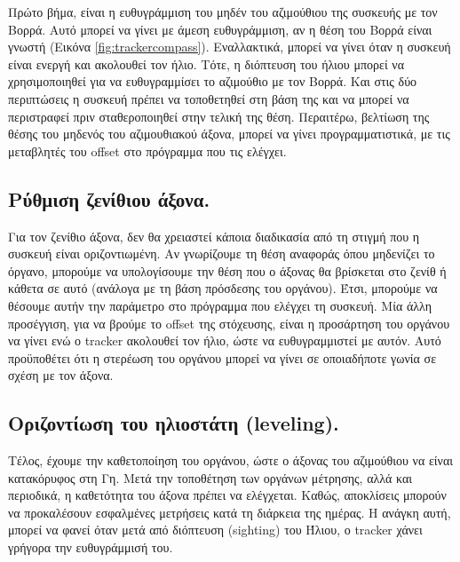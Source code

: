 \documentclass[
  a4paper,
  twoside,
  titlepage,
  11pt]{article}
\numberwithin{equation}{section}
\numberwithin{figure}{section}
\numberwithin{table}{section}
\begin{document}
Πρώτο βήμα, είναι η ευθυγράμμιση του μηδέν του αζιμούθιου της συσκευής με τον Βορρά. Αυτό μπορεί να γίνει με άμεση ευθυγράμμιση, αν η θέση του Βορρά είναι γνωστή (Εικόνα \ref{fig:trackercompass}). Εναλλακτικά, μπορεί να γίνει όταν η συσκευή είναι ενεργή και ακολουθεί τον ήλιο. Τότε, η διόπτευση του ήλιου μπορεί να χρησιμοποιηθεί για να ευθυγραμμίσει το αζιμούθιο με τον Βορρά. Και στις δύο περιπτώσεις η συσκευή πρέπει να τοποθετηθεί στη βάση της και να μπορεί να περιστραφεί πριν σταθεροποιηθεί στην τελική της θέση. Περαιτέρω, βελτίωση της θέσης του μηδενός του αζιμουθιακού άξονα, μπορεί να γίνει προγραμματιστικά, με τις μεταβλητές του offset στο πρόγραμμα που τις ελέγχει.

\hypertarget{ux3c1ux3cdux3b8ux3bcux3b9ux3c3ux3b7-ux3b6ux3b5ux3bdux3afux3b8ux3b9ux3bfux3c5-ux3acux3beux3bfux3bdux3b1.}{%
\subsection{Ρύθμιση ζενίθιου άξονα.}\label{ux3c1ux3cdux3b8ux3bcux3b9ux3c3ux3b7-ux3b6ux3b5ux3bdux3afux3b8ux3b9ux3bfux3c5-ux3acux3beux3bfux3bdux3b1.}}

Για τον ζενίθιο άξονα, δεν θα χρειαστεί κάποια διαδικασία από τη στιγμή που η συσκευή είναι οριζοντιωμένη. Αν γνωρίζουμε τη θέση αναφοράς όπου μηδενίζει το όργανο, μπορούμε να υπολογίσουμε την θέση που ο άξονας θα βρίσκεται στο ζενίθ ή κάθετα σε αυτό (ανάλογα με τη βάση πρόσδεσης του οργάνου). Έτσι, μπορούμε να θέσουμε αυτήν την παράμετρο στο πρόγραμμα που ελέγχει τη συσκευή. Μία άλλη προσέγγιση, για να βρούμε το offset της στόχευσης, είναι η προσάρτηση του οργάνου να γίνει ενώ ο tracker ακολουθεί τον ήλιο, ώστε να ευθυγραμμιστεί με αυτόν. Αυτό προϋποθέτει ότι η στερέωση του οργάνου μπορεί να γίνει σε οποιαδήποτε γωνία σε σχέση με τον άξονα.

\hypertarget{ux3bfux3c1ux3b9ux3b6ux3bfux3bdux3c4ux3afux3c9ux3c3ux3b7-ux3c4ux3bfux3c5-ux3b7ux3bbux3b9ux3bfux3c3ux3c4ux3acux3c4ux3b7-leveling.}{%
\subsection{Οριζοντίωση του ηλιοστάτη (leveling).}\label{ux3bfux3c1ux3b9ux3b6ux3bfux3bdux3c4ux3afux3c9ux3c3ux3b7-ux3c4ux3bfux3c5-ux3b7ux3bbux3b9ux3bfux3c3ux3c4ux3acux3c4ux3b7-leveling.}}

Τέλος, έχουμε την καθετοποίηση του οργάνου, ώστε ο άξονας του αζιμούθιου να είναι κατακόρυφος στη Γη. Μετά την τοποθέτηση των οργάνων μέτρησης, αλλά και περιοδικά, η καθετότητα του άξονα πρέπει να ελέγχεται. Καθώς, αποκλίσεις μπορούν να προκαλέσουν εσφαλμένες μετρήσεις κατά τη διάρκεια της ημέρας. Η ανάγκη αυτή, μπορεί να φανεί όταν μετά από διόπτευση (sighting) του Ήλιου, ο tracker χάνει γρήγορα την ευθυγράμμισή του.
\end{document}
